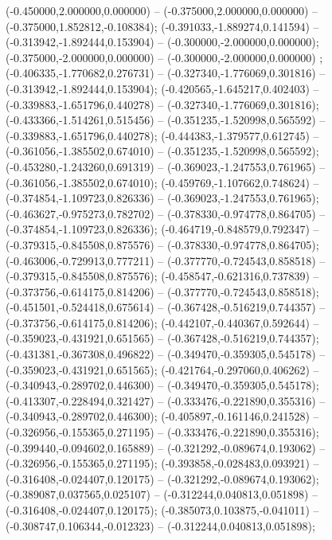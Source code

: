  (-0.450000,2.000000,0.000000) -- (-0.375000,2.000000,0.000000) -- (-0.375000,1.852812,-0.108384);
 (-0.391033,-1.889274,0.141594) -- (-0.313942,-1.892444,0.153904) -- (-0.300000,-2.000000,0.000000);
 (-0.375000,-2.000000,0.000000) -- (-0.300000,-2.000000,0.000000) ;
 (-0.406335,-1.770682,0.276731) -- (-0.327340,-1.776069,0.301816) -- (-0.313942,-1.892444,0.153904);
 (-0.420565,-1.645217,0.402403) -- (-0.339883,-1.651796,0.440278) -- (-0.327340,-1.776069,0.301816);
 (-0.433366,-1.514261,0.515456) -- (-0.351235,-1.520998,0.565592) -- (-0.339883,-1.651796,0.440278);
 (-0.444383,-1.379577,0.612745) -- (-0.361056,-1.385502,0.674010) -- (-0.351235,-1.520998,0.565592);
 (-0.453280,-1.243260,0.691319) -- (-0.369023,-1.247553,0.761965) -- (-0.361056,-1.385502,0.674010);
 (-0.459769,-1.107662,0.748624) -- (-0.374854,-1.109723,0.826336) -- (-0.369023,-1.247553,0.761965);
 (-0.463627,-0.975273,0.782702) -- (-0.378330,-0.974778,0.864705) -- (-0.374854,-1.109723,0.826336);
 (-0.464719,-0.848579,0.792347) -- (-0.379315,-0.845508,0.875576) -- (-0.378330,-0.974778,0.864705);
 (-0.463006,-0.729913,0.777211) -- (-0.377770,-0.724543,0.858518) -- (-0.379315,-0.845508,0.875576);
 (-0.458547,-0.621316,0.737839) -- (-0.373756,-0.614175,0.814206) -- (-0.377770,-0.724543,0.858518);
 (-0.451501,-0.524418,0.675614) -- (-0.367428,-0.516219,0.744357) -- (-0.373756,-0.614175,0.814206);
 (-0.442107,-0.440367,0.592644) -- (-0.359023,-0.431921,0.651565) -- (-0.367428,-0.516219,0.744357);
 (-0.431381,-0.367308,0.496822) -- (-0.349470,-0.359305,0.545178) -- (-0.359023,-0.431921,0.651565);
 (-0.421764,-0.297060,0.406262) -- (-0.340943,-0.289702,0.446300) -- (-0.349470,-0.359305,0.545178);
 (-0.413307,-0.228494,0.321427) -- (-0.333476,-0.221890,0.355316) -- (-0.340943,-0.289702,0.446300);
 (-0.405897,-0.161146,0.241528) -- (-0.326956,-0.155365,0.271195) -- (-0.333476,-0.221890,0.355316);
 (-0.399440,-0.094602,0.165889) -- (-0.321292,-0.089674,0.193062) -- (-0.326956,-0.155365,0.271195);
 (-0.393858,-0.028483,0.093921) -- (-0.316408,-0.024407,0.120175) -- (-0.321292,-0.089674,0.193062);
 (-0.389087,0.037565,0.025107) -- (-0.312244,0.040813,0.051898) -- (-0.316408,-0.024407,0.120175);
 (-0.385073,0.103875,-0.041011) -- (-0.308747,0.106344,-0.012323) -- (-0.312244,0.040813,0.051898);

